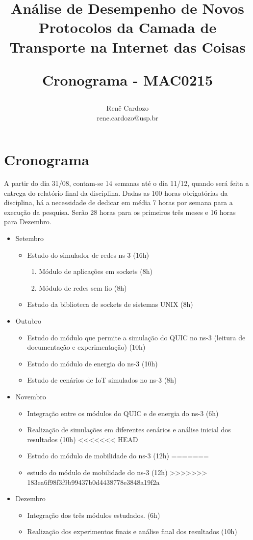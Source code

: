 \documentclass{article}
\author{Renê Cardozo \\ 
        rene.cardozo@usp.br}
\title{Análise de Desempenho de Novos Protocolos da Camada de Transporte na Internet das Coisas \\
\begin{Large} Cronograma - MAC0215 \end{Large}
}
\date{}
\begin{document}
\maketitle

\section*{Cronograma}
A partir do dia 31/08, contam-se 14 semanas até o dia 11/12, quando será feita a entrega do relatório final da
disciplina. Dadas as 100 horas obrigatórias da disciplina, há a necessidade de dedicar em média 7 horas por semana para
a execução da pesquisa. Serão 28 horas para os primeiros três meses e 16 horas para Dezembro.

\FloatBarrier

\begin{itemize}
\item Setembro
    \begin{itemize}
        \item Estudo do simulador de redes ns-3 (16h)
        \begin{enumerate}
            \item Módulo de aplicações em sockets (8h)
            \item Módulo de redes sem fio (8h)
        \end{enumerate}
        \item Estudo da biblioteca de sockets de sistemas UNIX (8h)
    \end{itemize}
\item Outubro
    \begin{itemize}
        \item Estudo do módulo que permite a simulação do QUIC no ns-3 (leitura de documentação e experimentação) (10h)
        \item Estudo do módulo de energia do ns-3 (10h)
        \item Estudo de cenários de IoT simulados no ns-3 (8h)
    \end{itemize}
\item Novembro
    \begin{itemize}
        \item Integração entre os módulos do QUIC e de energia do ns-3 (6h)
        \item Realização de simulações em diferentes cenários e análise inicial dos resultados (10h)
<<<<<<< HEAD
        \item Estudo do módulo de mobilidade do ns-3 (12h)
=======
        \item estudo do módulo de mobilidade do ns-3 (12h)
>>>>>>> 183ea6f98f3f9b99437b0d4438778e3848a19f2a
    \end{itemize}
\item Dezembro
    \begin{itemize}
        \item Integração dos três módulos estudados. (6h)
        \item Realização dos experimentos finais e análise final dos resultados (10h)
    \end{itemize}
\end{itemize}
\end{document}
